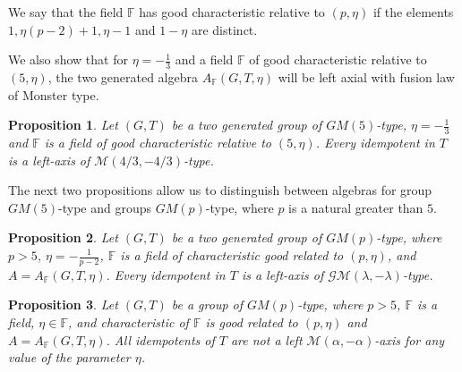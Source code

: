 \documentclass[12pt]{article}
\newcommand\F{\mathbb{F}}
\newcommand\al{\alpha}
\newcommand\lm{\lambda}
\newtheorem{Th}{Theorem}
\newtheorem{prop}{Proposition}
\begin{document}
	
	
	
	
	
We say that the field $\F$ has good characteristic relative to $(p,\eta)$ if the elements $1, \eta(p-2)+1, \eta-1$ and $1-\eta$ are distinct.

We also show that for $\eta=-\frac{1}{3}$ and a field $\F$ of good characteristic relative to $(5,\eta)$, the two generated algebra $A_{\F}(G,T,\eta)$ will be left axial with fusion law of Monster type.

\begin{prop}
	Let $(G,T)$ be a two generated group of $GM(5)$-type, $\eta=-\frac{1}{3}$ and $\F$ is a field of good characteristic relative to $(5,\eta)$. Every idempotent in $T$ is a left-axis of $\mathcal M(4/3,-4/3)$-type.
\end{prop}

The next two propositions allow us to distinguish between algebras for group $GM(5)$-type and groups $GM(p)$-type, where $p$ is a natural greater than $5$.

\begin{prop}
Let $(G,T)$ be a two generated group of $GM(p)$-type, where $p>5$, $\eta=-\frac{1}{p-2}$, $\F$ is a field of characteristic good related to $(p,\eta)$, and $A=A_{\F}(G,T,\eta)$. Every idempotent in $T$ is a left-axis of $\mathcal{GM}(\lm,-\lm)$-type.
\end{prop}
\begin{prop}
	Let $(G,T)$ be a group of $GM(p)$-type, where $p>5$, $\F$ is a field, $\eta\in \F$, and characteristic of $\F$ is good related to $(p,\eta)$ and $A=A_{\F}(G,T,\eta)$. All idempotents of $T$ are not a left $\mathcal M(\al,-\al)$-axis for any value of the parameter $\eta $.
\end{prop}
\end{document}
